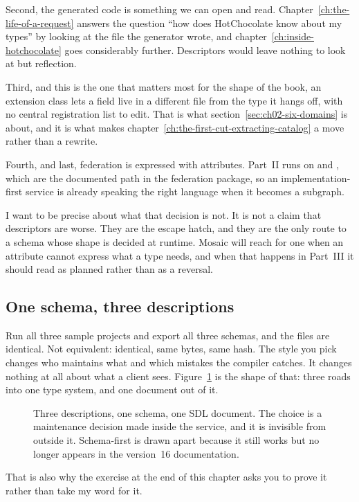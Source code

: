 Second, the generated code is something we can open and read.
Chapter~\ref{ch:the-life-of-a-request} answers the question \enquote{how does
HotChocolate know about my types} by looking at the file the generator wrote,
and chapter~\ref{ch:inside-hotchocolate} goes considerably further. Descriptors
would leave nothing to look at but reflection.

Third, and this is the one that matters most for the shape of the book, an
extension class lets a field live in a different file from the type it hangs
off, with no central registration list to edit. That is what
section~\ref{sec:ch02-six-domains} is about, and it is what makes
chapter~\ref{ch:the-first-cut-extracting-catalog} a move rather than a rewrite.

Fourth, and last, federation is expressed with attributes. Part~II runs on
\code{[Key]} and \code{[ReferenceResolver]}, which are the documented path in
the federation package, so an implementation-first service is already speaking
the right language when it becomes a subgraph.

I want to be precise about what that decision is not. It is not a claim that
descriptors are worse. They are the escape hatch, and they are the only route to
a schema whose shape is decided at runtime. Mosaic will reach for one when an
attribute cannot express what a type needs, and when that happens in Part~III it
should read as planned rather than as a reversal.

\subsection*{One schema, three descriptions}

Run all three sample projects and export all three schemas, and the files are
identical. Not equivalent: identical, same bytes, same hash. The style you pick
changes who maintains what and which mistakes the compiler catches. It changes
nothing at all about what a client sees.
Figure~\ref{fig:ch02-authoring-styles} is the shape of that: three roads into
one type system, and one document out of it.

\begin{figure}[htbp]
  \centering
  
  \caption{Three descriptions, one schema, one SDL document. The choice is a
  maintenance decision made inside the service, and it is invisible from
  outside it. Schema-first is drawn apart because it still works but no longer
  appears in the version~16 documentation.}
  \label{fig:ch02-authoring-styles}
\end{figure}

That is also why the exercise at the end of this chapter asks you to prove it
rather than take my word for it.
